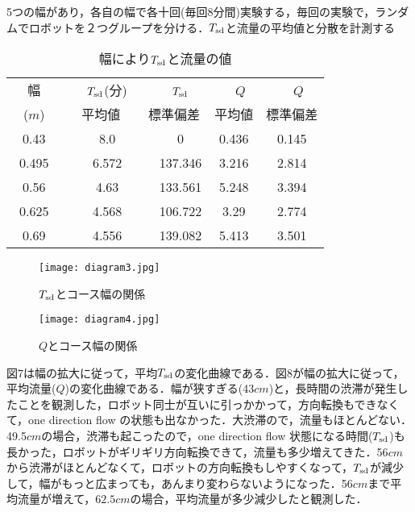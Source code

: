5つの幅があり，各自の幅で各十回(毎回8分間)実験する，毎回の実験で，ランダムでロボットを２つグループを分ける．$T_{\rm sd}$と流量の平均値と分散を計測する
\begin{table}[!ht]
\setlength\tabcolsep{1pt}
\begin{center}
\begin{tabular}{|c|c|c|c|c|}
\hline
幅　&　$T_{\rm sd}$(分)　&　$T_{\rm sd}$　&　$Q$　&　$Q$　\\
($m$)   &   平均値 & 標準偏差 & 平均値 & 標準偏差 \\
\hline
0.43　&　8.0　&　0 & 0.436 & 0.145 \\
\hline
0.495　&　6.572　&　137.346 & 3.216 & 2.814 \\
\hline
0.56　&　4.63　&　133.561 & 5.248 & 3.394 \\
\hline
0.625　&　4.568　&　106.722 & 3.29 & 2.774 \\
\hline
0.69　&　4.556　&　139.082 & 5.413 & 3.501 \\
\hline
\end{tabular}
\end{center}
\caption{
幅により$T_{\rm sd}$と流量の値
}
\end{table}
\vspace{-6mm}
\begin{figure}[!ht]
    \centering
    \texttt{[image: diagram3.jpg]}
    \caption{$T_{\rm sd}$とコース幅の関係}
\end{figure}
\vspace{-6mm}
\begin{figure}[!ht]
    \centering
    \texttt{[image: diagram4.jpg]}
    \caption{$Q$とコース幅の関係}
\end{figure}

図$7$は幅の拡大に従って，平均$T_{\rm sd}$の変化曲線である．図$8$が幅の拡大に従って，平均流量($Q$)の変化曲線である．幅が狭すぎる(43$cm$)と，長時間の渋滞が発生したことを観測した，ロボット同士が互いに引っかかって，方向転換もできなくて，one direction flow の状態も出なかった．大渋滞ので，流量もほとんどない．49.5$cm$の場合，渋滞も起こったので，one direction flow 状態になる時間($T_{\rm sd}$)も長かった，ロボットがギリギリ方向転換できて，流量も多少増えてきた．56$cm$から渋滞がほとんどなくて，ロボットの方向転換もしやすくなって，$T_{\rm sd}$が減少して，幅がもっと広まっても，あんまり変わらないようになった．56$cm$まで平均流量が増えて，$62.5cm$の場合，平均流量が多少減少したと観測した．

